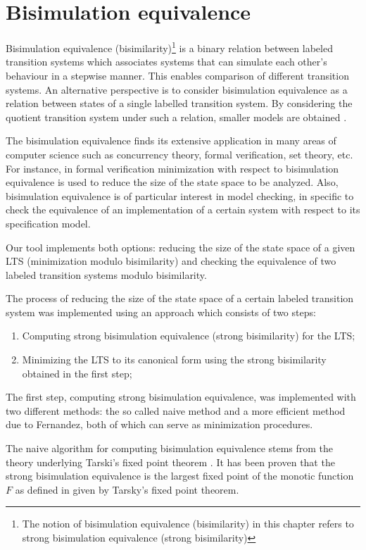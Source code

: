 \section{Bisimulation equivalence}
Bisimulation equivalence (bisimilarity)\footnote{The notion of bisimulation equivalence (bisimilarity) in this chapter 
refers to strong bisimulation equivalence (strong bisimilarity)} is a binary relation between labeled transition systems which associates systems that can simulate each other's behaviour in a stepwise manner. This enables comparison of different transition systems. An alternative perspective is to consider bisimulation equivalence as a relation between states of a single labelled transition system. By considering the quotient transition system under such a relation, smaller models are obtained \cite{ModelChecking}.

The bisimulation equivalence finds its extensive application in many areas of computer science such as concurrency theory, formal verification, set theory, etc. For instance, in formal verification minimization with respect to bisimulation equivalence is used to reduce the size of the state space to be analyzed. Also, bisimulation equivalence is of particular interest in model checking, in specific to check the equivalence of an implementation of a certain system with respect to its specification model.

Our tool implements both options: reducing the size of the state space of a given LTS (minimization modulo bisimilarity) and checking the equivalence of two labeled transition systems modulo bisimilarity.

The process of reducing the size of the state space of a certain labeled transition system was implemented using an approach which consists of two steps:
\begin{enumerate}
\item Computing strong bisimulation equivalence (strong bisimilarity) for the LTS;
\item Minimizing the LTS to its canonical form using the strong bisimilarity obtained in the first step;
\end{enumerate}

The first step, computing strong bisimulation equivalence, was implemented with two different methods: the so called
naive method and a more efficient method due to Fernandez, both of which can serve as minimization procedures.

The naive algorithm \cite{ReactiveSystems1} for computing bisimulation equivalence stems from the theory underlying 
Tarski's fixed point theorem \cite{ReactiveSystems2}. It has been proven that the strong bisimulation equivalence is 
the largest fixed point of the monotic function $F$ as defined in \cite{ReactiveSystems1} given by Tarsky's fixed 
point theorem. 

